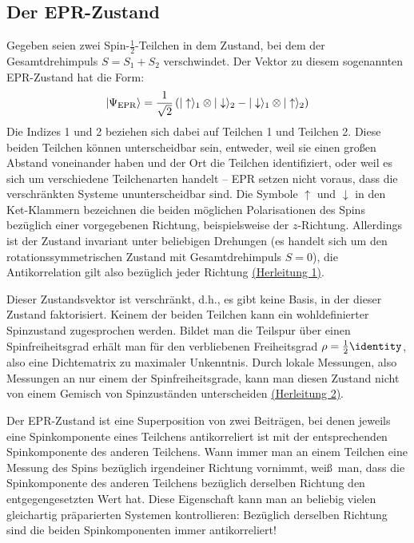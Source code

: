 \subsection{Der EPR-Zustand}

Gegeben seien zwei Spin-$\frac{1}{2}$-Teilchen in dem
Zustand, bei dem der Gesamt\-drehimpuls $S=S_1+S_2$
verschwindet.
Der Vektor zu diesem sogenannten 
EPR-Zustand hat die Form:
\begin{equation}
\label{eq_Multi_EPR}
      |\Psi_{\rm EPR}\rangle = \frac{1}{\sqrt{2}} \left(
        | \uparrow \rangle_1 \otimes |\downarrow \rangle_2 -
        |\downarrow \rangle_1 \otimes |\uparrow \rangle_2 \right) 
\end{equation} 
Die Indizes 1 und 2 beziehen sich dabei auf Teilchen 1
und Teilchen 2. Diese beiden Teilchen k\"onnen unterscheidbar sein,
entweder, weil sie einen gro\ss en Abstand voneinander haben und
der Ort die Teilchen identifiziert,
oder weil es sich um verschiedene Teilchenarten handelt --
EPR setzen nicht voraus, dass die verschr\"ankten Sys\-teme
ununterscheidbar sind. Die Symbole $\uparrow$ und $\downarrow$ 
in den Ket-Klammern bezeichnen die beiden m\"oglichen
Polarisationen des Spins bez\"uglich einer vorgegebenen
Richtung, beispielsweise der $z$-Richtung. Allerdings ist
der Zustand invariant unter beliebigen Drehungen
(es handelt sich um den rotationssymmetrischen 
Zustand mit Gesamt\-dreh\-impuls $S=0$), die Antikorrelation gilt also 
bez\"uglich jeder Richtung \hyperref[sec_EPR_A]{(Herleitung 1)}. 

Dieser Zustandsvektor 
ist verschr\"ankt, d.h., es gibt keine Basis, in
der dieser Zustand faktorisiert. Keinem der beiden Teilchen
kann ein wohldefinierter Spinzustand zugesprochen werden.
Bildet man die Teilspur \"uber einen Spinfreiheitsgrad %
erh\"alt man f\"ur den verbliebenen Freiheitsgrad 
$\rho=\frac{1}{2} \identity$, also
eine Dichte\-mat\-rix zu \glqq maximaler Unkenntnis\grqq. Durch
lokale Messungen, also Messungen an nur einem der
Spinfreiheitsgrade, kann man diesen Zustand nicht von einem
Gemisch von Spinzust\"anden unterscheiden \hyperref[sec_EPR_B]{(Herleitung 2)}. 

Der EPR-Zustand ist eine Superposition von zwei Beitr\"agen,
bei denen jeweils eine Spinkomponente eines Teilchens
antikorreliert ist mit der entsprechenden Spinkomponente 
des anderen Teilchens. Wann immer man an einem Teilchen
eine Messung des Spins bez\"uglich irgendeiner Richtung
vornimmt, wei\ss\ man, dass die Spinkomponente
des anderen Teilchens bez\"uglich derselben Richtung den
entgegengesetzten Wert hat. Diese Eigenschaft kann man
an beliebig vielen gleichartig pr\"aparierten Systemen
kontrollieren: Bez\"uglich derselben Richtung sind die
beiden Spinkomponenten immer antikorreliert! 

